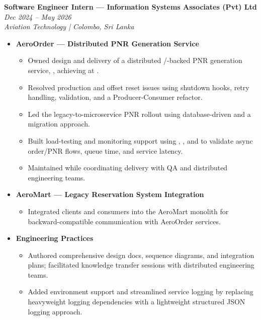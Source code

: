 \noindent
\textbf{Software Engineer Intern --- Information Systems Associates (Pvt) Ltd} \hfill \textit{Dec 2024 -- May 2026}\\
\noindent
\textit{Aviation Technology | Colombo, Sri Lanka}\\[0.05em]

\begin{itemize}[leftmargin=*, itemsep=0.3em, topsep=0.01em]

    \item \textbf{AeroOrder --- Distributed PNR Generation Service}
    \begin{itemize}[leftmargin=1.5em, itemsep=0.2em, topsep=0.1em]
        \item Owned design and delivery of a distributed /-backed PNR generation service, , achieving  at .
        \item Resolved production  and offset reset issues using shutdown hooks, retry handling, validation, and a Producer-Consumer refactor.
        \item Led the legacy-to-microservice PNR rollout using database-driven  and a  migration approach.
        \item Built load-testing and monitoring support using , , and  to validate async order/PNR flows, queue time, and service latency.
        \item Maintained  while coordinating delivery with QA and distributed engineering teams.
    \end{itemize}

    \item \textbf{AeroMart — Legacy Reservation System Integration}
    \begin{itemize}[leftmargin=1.5em, itemsep=0.2em, topsep=0.1em]
        \item Integrated  clients and  consumers into the  AeroMart monolith for backward-compatible communication with AeroOrder services.
    \end{itemize}

    \item \textbf{Engineering Practices}
    \begin{itemize}[leftmargin=1.5em, itemsep=0.2em, topsep=0.1em]
        \item Authored comprehensive design docs, sequence diagrams, and integration plans; facilitated knowledge transfer sessions with distributed engineering teams.
        \item Added  environment support and streamlined service logging by replacing heavyweight logging dependencies with a lightweight structured JSON logging approach.
    \end{itemize}

\end{itemize}
